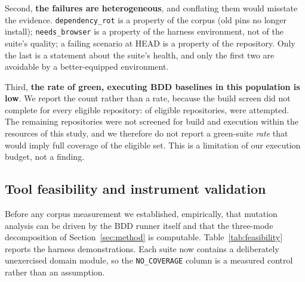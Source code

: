 Second, \textbf{the failures are heterogeneous}, and conflating them would misstate the evidence.
\texttt{dependency\_rot} is a property of the corpus (old pins no longer install);
\texttt{needs\_browser} is a property of the harness environment, not of the suite's quality; a
failing scenario at HEAD is a property of the repository. Only the last is a statement about the
suite's health, and only the first two are avoidable by a better-equipped environment.

Third, \textbf{the rate of green, executing BDD baselines in this population is low}. We report the
count rather than a rate, because the build screen did not complete for every eligible repository: of
\Neligible{} eligible repositories, \Nbuildtested{} were attempted. The remaining repositories were
not screened for build and execution within the resources of this study, and we therefore do not
report a green-suite \emph{rate} that would imply full coverage of the eligible set. This is a
limitation of our execution budget, not a finding.

\subsection{Tool feasibility and instrument validation}

Before any corpus measurement we established, empirically, that mutation analysis can be driven by the
BDD runner itself and that the three-mode decomposition of
Section~\ref{sec:method} is computable. Table~\ref{tab:feasibility} reports the harness
demonstrations. Each suite now contains a deliberately unexercised domain module, so the
\texttt{NO\_COVERAGE} column is a measured control rather than an assumption.

